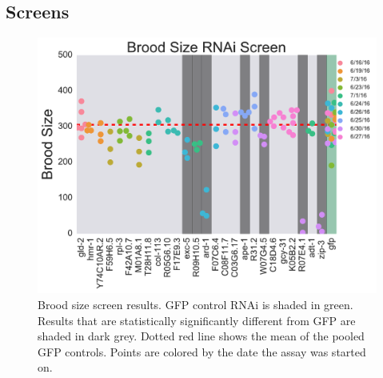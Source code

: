 \documentclass[9pt,twocolumn,twoside]{gsag3jnl}
\begin{document}
\subsection*{Screens}
\label{subs:Screens}

\begin{figure}
\renewcommand{\familydefault}{\sfdefault}\normalfont{}
\centering
\includegraphics[width=\linewidth]{../output/figs/final_figs/rnai_brood_assay_results.pdf}
\caption{Brood size screen results. GFP control RNAi is shaded in green. Results that are statistically significantly different from GFP are shaded in dark grey. Dotted red line shows the mean of the pooled GFP controls. Points are colored by the date the assay was started on.
}%
\label{fig:broodassay}
\end{figure}
\end{document}
